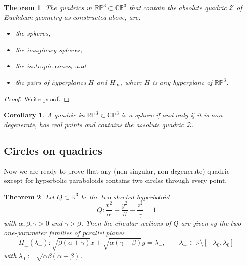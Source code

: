 \documentclass[10pt, a4paper]{article}
\theoremstyle{BoldTopSpacing}
\newtheorem{theorem}{Theorem}[section]
\theoremstyle{BoldTopSpacing}
\theoremstyle{BoldTopSpacing}
\newtheorem{corollary}{Corollary}[theorem]
\theoremstyle{BoldTopBottomSpacing}
\theoremstyle{BoldTopSpacing}
\theoremstyle{BoldTopBottomSpacing}
\theoremstyle{remark}
\begin{document}
\begin{theorem}
\label{thm:quadrics-contain-absolute}
The quadrics in $\mathbb{R}\mathbb{P}^3 \subset \mathbb{C}\mathbb{P}^3$ that contain the absolute quadric $\mathcal{Z}$ of Euclidean geometry \textemdash as constructed above, are:
\begin{itemize}[label=$\blacktriangleright$]
    \item the spheres,
    \item the imaginary spheres,
    \item the isotropic cones, and
    \item the pairs of hyperplanes $H$ and $H_{\infty}$, where $H$ is any hyperplane of $\mathbb{R}\mathbb{P}^3$.
\end{itemize}
\end{theorem}

\begin{proof}
Write proof.
\end{proof}

\begin{corollary}
\label{col:spheres-contain-absolute}
A quadric in $\mathbb{R}\mathbb{P}^3 \subset \mathbb{C}\mathbb{P}^3$ is a sphere if and only if it is non-degenerate, has real points and contains the absolute quadric $\mathcal{Z}$.
\end{corollary}

\subsection{Circles on quadrics}
\label{subsec:circles-on-quadrics}

Now we are ready to prove that any (non-singular, non-degenerate) quadric except for hyperbolic paraboloids contains two circles through every point.

\begin{theorem}
\label{thm:circular-sections-hyperboloid}
Let $Q \subset \mathbb{R}^3$ be the two-sheeted hyperboloid
\begin{equation}
\label{eq:two-sheeted-alpha-beta-gamma}
Q : \frac{x^2}{\alpha} - \frac{y^2}{\beta} - \frac{z^2}{\gamma} = 1
\end{equation}
with $\alpha, \beta, \gamma > 0$ and $\gamma > \beta$. Then the circular sections of $Q$ are given by the two one-parameter families of parallel planes
\begin{equation}
\label{eq:planes-two-sheeted}
\Pi_{\pm}(\lambda_{\pm}) :\sqrt{\beta (\alpha + \gamma)} x \pm \sqrt{\alpha (\gamma - \beta)} y = \lambda_{\pm}, \quad \quad \lambda_{\pm} \in \mathbb{R} \setminus \left[-\lambda_{0}, \lambda_{0} \right]
\end{equation}
with $\lambda_{0} := \sqrt{\alpha \beta (\alpha+\beta)}$.
\end{theorem}
\end{document}
